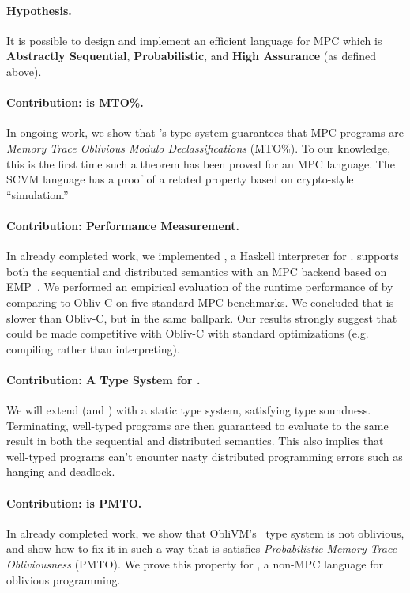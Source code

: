 \paragraph{Hypothesis.} It is possible to design and implement an efficient language for MPC which is \textbf{Abstractly Sequential},
\textbf{Probabilistic}, and \textbf{High Assurance} (as defined above).

\paragraph{Contribution: \mpc is MTO\%.} In ongoing work, we show that \mpc's type system guarantees that MPC programs are
\emph{Memory Trace Oblivious Modulo Declassifications} (MTO\%). To our knowledge, this is the first time such a theorem has been
proved for an MPC language. The SCVM language  has a proof of a related property based on crypto-style ``simulation.''

\paragraph{Contribution: \mpc Performance Measurement.} In already completed work, we implemented \system, a Haskell
interpreter for \mpc. \system supports both the sequential and distributed semantics with an MPC backend based on EMP~\cite{todo}.
We performed an empirical evaluation of the runtime performance of \system by comparing to Obliv-C on five standard MPC benchmarks. We concluded
that \system is slower than Obliv-C, but in the same ballpark. Our results strongly suggest that \system could be made competitive with Obliv-C
with standard optimizations (e.g. compiling rather than interpreting).

\paragraph{Contribution: A Type System for \mpc.} We will extend \mpc (and \system) with a static type system, satisfying type soundness.
Terminating, well-typed programs are then guaranteed to evaluate to the same result in both the sequential and distributed semantics.
This also implies that well-typed programs can't enounter nasty distributed programming errors such as hanging and deadlock.

\paragraph{Contribution: \obliv is PMTO.} In already completed work, we show that ObliVM's~\cite{todo} type system is not oblivious,
and show how to fix it in such a way that is satisfies \emph{Probabilistic Memory Trace Obliviousness} (PMTO).
We prove this property for \obliv, a non-MPC language for oblivious programming.


